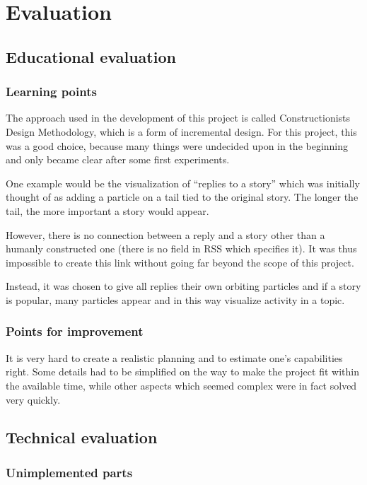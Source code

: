 \chapter{\label{cpt:evaluation}Evaluation}

\section{Educational evaluation}

\subsection{Learning points}

The approach used in the development of this project is called
Constructionists Design Methodology, which is a form of incremental
design. For this project, this was a good choice, because many things were
undecided upon in the beginning and only became clear after some first
experiments.

One example would be the visualization of ``replies to a story'' which was
initially thought of as adding a particle on a tail tied to the original
story. The longer the tail, the more important a story would appear.

However, there is no connection between a reply and a story other than a
humanly constructed one (there is no field in RSS which specifies it). It
was thus impossible to create this link without going far beyond the scope
of this project.

Instead, it was chosen to give all replies their own orbiting particles
and if a story is popular, many particles appear and in this way visualize
activity in a topic.

\subsection{Points for improvement}

It is very hard to create a realistic planning and to estimate one's
capabilities right. Some details had to be simplified on the way to make
the project fit within the available time, while other aspects which
seemed complex were in fact solved very quickly.

\section{Technical evaluation}

\subsection{Unimplemented parts}

